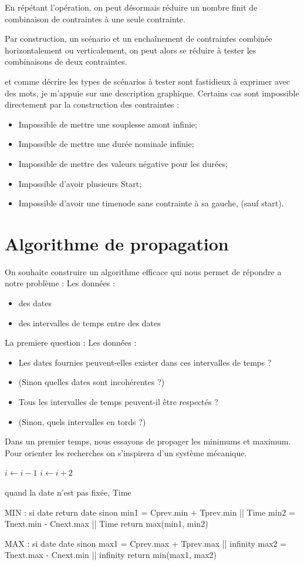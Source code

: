 En répétant l'opération, on peut désormais réduire un nombre finit de combinaison de contraintes à une seule contrainte.

Par construction, un scénario et un enchaînement de contraintes combinée horizontalement ou verticalement, on peut alors se réduire à tester les combinaisons de deux contraintes.

et comme décrire les types de scénarios à tester sont fastidieux à exprimer avec des mots, je m'appuie sur une description graphique.
Certains cas sont impossible directement par la construction des contraintes :
\begin{itemize}
    \item Impossible de mettre une souplesse amont infinie;
    \item Impossible de mettre une durée nominale infinie;
    \item Impossible de mettre des valeurs négative pour les durées;
    \item Impossible d'avoir plusieurs Start;
    \item Impossible d'avoir une timenode sans contrainte à sa gauche, (sauf start).
\end{itemize}


\section{Algorithme de propagation}
On souhaite construire un algorithme efficace qui nous permet de répondre a notre problème :
Les données :
\begin{itemize}
\item des dates
\item des intervalles de temps entre des dates
\end{itemize}

La premiere question :
Les données :
\begin{itemize}
\item Les dates fournies peuvent-elles exister dans ces intervalles de temps ?
\item (Sinon quelles dates sont incohérentes ?)
\item Tous les intervalles de temps peuvent-il être respectés ?
\item (Sinon, quels intervalles en tords ?)
\end{itemize}

Dans un premier temps, nous essayons de propager les minimums et maximum. Pour orienter les recherches on s'inspirera d'un système mécanique.

\begin{algorithmic}

        \STATE $i\gets i-1$
\ELSE
                \STATE $i\gets i+2$
        \ENDIF
\ENDIF 
\end{algorithmic}

quand la date n'est pas fixée, Time

MIN :
si date
return date
sinon
min1 = Cprev.min + Tprev.min || Time
min2 = Tnext.min - Cnext.max || Time
return max(min1, min2)

MAX :
si date
date
sinon
max1 = Cprev.max + Tprev.max || infinity
max2 = Tnext.max - Cnext.min || infinity
return min(max1, max2)

